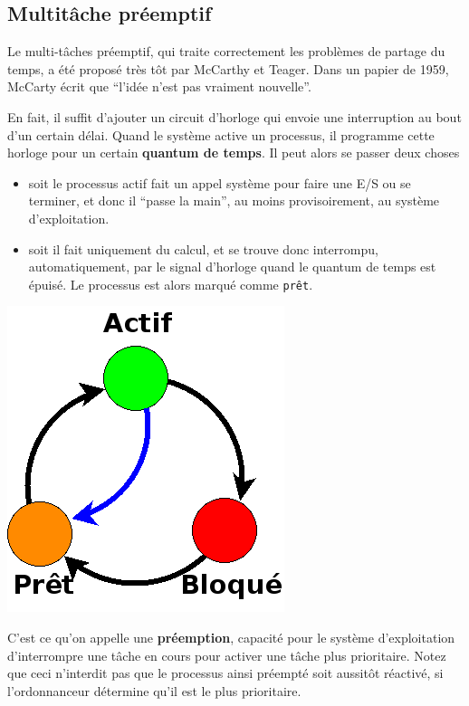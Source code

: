 \begin{multicols}{2}
\subsection{Multitâche préemptif}

Le multi-tâches préemptif, qui traite correctement les problèmes de
partage du temps, a été proposé très tôt par McCarthy et Teager. Dans
un papier de 1959, McCarty écrit que ``l'idée n'est pas vraiment
nouvelle''.

En fait, il suffit d'ajouter un circuit d'horloge qui envoie une
interruption au bout d'un certain délai.  Quand le système active un
processus, il programme cette horloge pour un certain \textbf{quantum
  de temps}. Il peut alors se passer deux choses
\begin{itemize}
\item soit le processus actif fait un appel système pour faire une E/S
  ou se terminer, et donc il ``passe la main'', au moins
  provisoirement, au système d'exploitation.
\item soit il fait uniquement du calcul, et se trouve donc interrompu,
  automatiquement, par le signal d'horloge quand le quantum de temps
  est épuisé. Le processus est alors marqué comme \texttt{prêt}.
\end{itemize}


    \begin{center}
      \includegraphics[width=0.7\linewidth]{Figures/pret-actif-bloque3.png}
    \end{center}

C'est ce qu'on appelle une \textbf{préemption}, capacité pour le système 
d'exploitation d'interrompre une tâche en cours pour activer une tâche plus prioritaire.
 Notez que ceci n'interdit pas que le processus ainsi préempté soit aussitôt
réactivé, si l'ordonnanceur détermine qu'il est le plus prioritaire.



\end{multicols}
